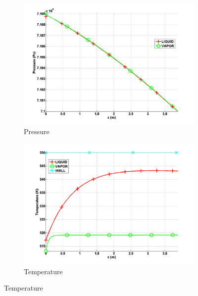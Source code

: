 \documentclass{anstrans}
\begin{document}
\begin{figure}[H]
        \centering
        \begin{subfigure}[b]{0.5\textwidth}
                \centering
                \includegraphics[width=\textwidth]{plots/ANS_WINTER_2014_7Eqn_pressure.png}
                \caption{Pressure}
                \label{fig:pressure}
        \end{subfigure}%

        \begin{subfigure}[b]{0.5\textwidth}
                \centering
                \includegraphics[width=\textwidth]{plots/ANS_WINTER_2014_7Eqn_temperature.png}
                \caption{Temperature}
                \label{fig:temperature}
        \end{subfigure}%
                

\end{figure}
\end{document}
